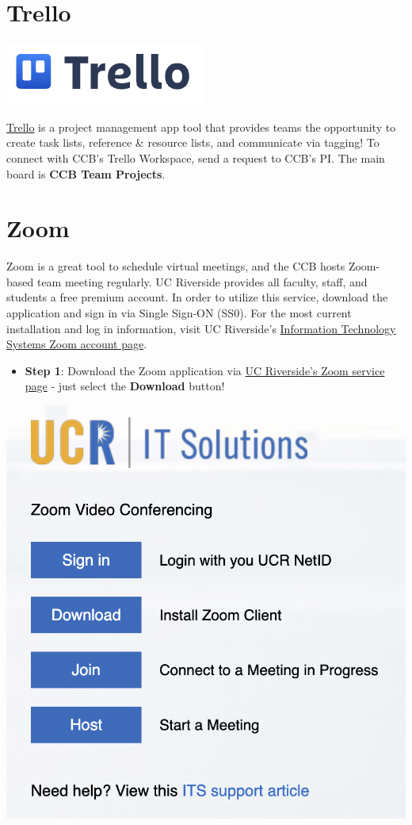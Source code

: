 \documentclass[
]{book}
\providecommand{\tightlist}{%
  \setlength{\itemsep}{0pt}\setlength{\parskip}{0pt}}
\begin{document}
\hypertarget{trello}{%
\section{Trello}\label{trello}}

\begin{flushleft}\includegraphics[width=0.3\linewidth]{images/trello} \end{flushleft}

\href{https://trello.com/en}{Trello} is a project management app tool that provides teams the opportunity to create task lists, reference \& resource lists, and communicate via tagging! To connect with CCB's Trello Workspace, send a request to CCB's PI. The main board is \textbf{CCB Team Projects}.

\hypertarget{zoom}{%
\section{Zoom}\label{zoom}}

Zoom is a great tool to schedule virtual meetings, and the CCB hosts Zoom-based team meeting regularly. UC Riverside provides all faculty, staff, and students a free premium account. In order to utilize this service, download the application and sign in via Single Sign-ON (SS0). For the most current installation and log in information, visit UC Riverside's \href{https://its.ucr.edu/blog/2019/12/17/changes-ucr-zoom-account-access}{Information Technology Systems Zoom account page}.

\begin{itemize}
\tightlist
\item
  \textbf{Step 1}: Download the Zoom application via \href{https://ucr.zoom.us/}{UC Riverside's Zoom service page} - just select the \textbf{Download} button!
\end{itemize}

\begin{center}\includegraphics[width=0.75\linewidth]{images/zoomdownload} \end{center}
\end{document}
